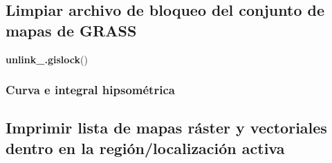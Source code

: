 \documentclass[11pt,]{article}
\newenvironment{Shaded}{\begin{snugshade}}{\end{snugshade}}
\newcommand{\KeywordTok}[1]{\textcolor[rgb]{0.13,0.29,0.53}{\textbf{#1}}}
\newcommand{\DataTypeTok}[1]{\textcolor[rgb]{0.13,0.29,0.53}{#1}}
\newcommand{\StringTok}[1]{\textcolor[rgb]{0.31,0.60,0.02}{#1}}
\newcommand{\OtherTok}[1]{\textcolor[rgb]{0.56,0.35,0.01}{#1}}
\newcommand{\OperatorTok}[1]{\textcolor[rgb]{0.81,0.36,0.00}{\textbf{#1}}}
\newcommand{\NormalTok}[1]{#1}
\begin{document}
\subsection{Limpiar archivo de bloqueo del conjunto de mapas de
GRASS}\label{limpiar-archivo-de-bloqueo-del-conjunto-de-mapas-de-grass-3}

\begin{Shaded}
\begin{Highlighting}[]
\KeywordTok{unlink_.gislock}\NormalTok{()}
\end{Highlighting}
\end{Shaded}

\subsubsection{Curva e integral
hipsométrica}\label{curva-e-integral-hipsomuxe9trica}

\begin{Shaded}
\end{Shaded}

\begin{Shaded}
\end{Shaded}

\subsection{Imprimir lista de mapas ráster y vectoriales dentro en la
región/localización
activa}\label{imprimir-lista-de-mapas-ruxe1ster-y-vectoriales-dentro-en-la-regiuxf3nlocalizaciuxf3n-activa-2}
\end{document}
